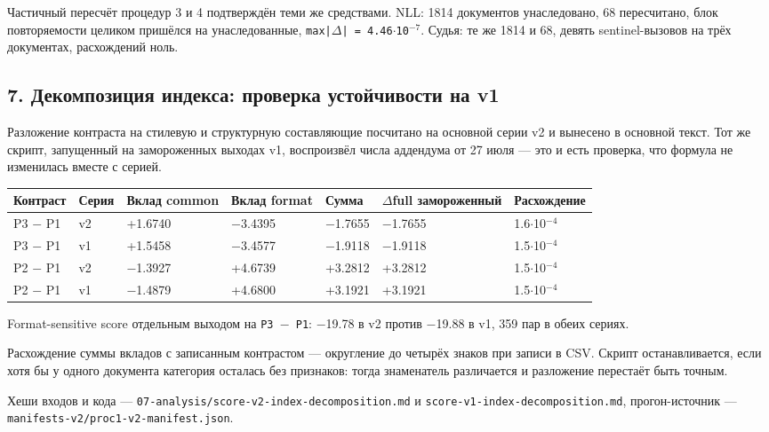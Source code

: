 \documentclass[11pt,a4paper]{article}
\renewcommand{\_}{\textunderscore\allowbreak}
\begin{document}
Частичный пересчёт процедур 3 и 4 подтверждён теми же средствами. NLL: 1814 документов унаследовано, 68 пересчитано, блок повторяемости целиком пришёлся на унаследованные, \texttt{max|$\Delta$| = 4.46$\cdot$10$^{-7}$}. Судья: те же 1814 и 68, девять sentinel-вызовов на трёх документах, расхождений ноль.

\subsection{7. Декомпозиция индекса: проверка устойчивости на v1}

Разложение контраста на стилевую и структурную составляющие посчитано на основной серии v2 и вынесено в основной текст. Тот же скрипт, запущенный на замороженных выходах v1, воспроизвёл числа аддендума от 27 июля — это и есть проверка, что формула не изменилась вместе с серией.

\begin{center}
\small
\begin{tabular}{lllllll}
\toprule
Контраст & Серия & Вклад common & Вклад format & Сумма & $\Delta$full замороженный & Расхождение \\
\midrule
P3 $-$ P1 & v2 & +1.6740 & $-$3.4395 & $-$1.7655 & $-$1.7655 & 1.6$\cdot$10$^{-4}$ \\
P3 $-$ P1 & v1 & +1.5458 & $-$3.4577 & $-$1.9118 & $-$1.9118 & 1.5$\cdot$10$^{-4}$ \\
P2 $-$ P1 & v2 & $-$1.3927 & +4.6739 & +3.2812 & +3.2812 & 1.5$\cdot$10$^{-4}$ \\
P2 $-$ P1 & v1 & $-$1.4879 & +4.6800 & +3.1921 & +3.1921 & 1.5$\cdot$10$^{-4}$ \\
\bottomrule
\end{tabular}
\end{center}

Format-sensitive score отдельным выходом на \texttt{P3 $-$ P1}: $-$19.78 в v2 против $-$19.88 в v1, 359 пар в обеих сериях.

Расхождение суммы вкладов с записанным контрастом — округление до четырёх знаков при записи в CSV. Скрипт останавливается, если хотя бы у одного документа категория осталась без признаков: тогда знаменатель различается и разложение перестаёт быть точным.

Хеши входов и кода — \texttt{07-\allowbreak{}analysis/score-\allowbreak{}v2-\allowbreak{}index-\allowbreak{}decomposition.md} и \texttt{score-\allowbreak{}v1-\allowbreak{}index-\allowbreak{}decomposition.md}, прогон-источник — \texttt{manifests-\allowbreak{}v2/proc1-\allowbreak{}v2-\allowbreak{}manifest.json}.
\end{document}

